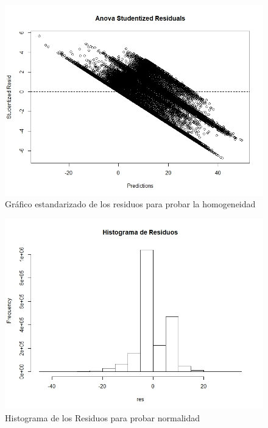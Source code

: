 \documentclass[a4paper,10pt,twocolumn]{report}
\begin{document}
	\begin{figure}[H]
		\centering
		\includegraphics[width=0.9\linewidth]{img/anova/anova_studentized_residuals}
		\caption{Gráfico estandarizado de los residuos para probar la homogeneidad}
		\label{fig:anova_studentized_residuals}
	\end{figure}
	
	\begin{figure}[H]
		\centering
		\includegraphics[width=0.9\linewidth]{img/anova/residuals_histogram}
		\caption{Histograma de los Residuos para probar normalidad}
		\label{fig:residuals_histogram}
	\end{figure}
	
\end{document}
